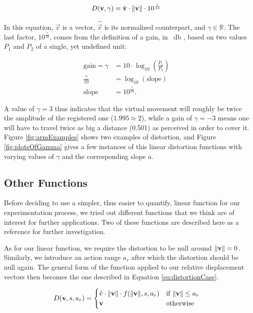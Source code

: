 \begin{equation}
\label{eq:DistortionFunction}
D(\mathbf{v},\gamma ) = \hat{\mathbf{v}} \cdot \lVert\mathbf{v}\rVert \cdot 10^{\frac{\gamma}{10}}
\end{equation}

In this equation, $\vec{v}$ is a vector, $\hat{\vec{v}}$ is its normalized counterpart, and $\gamma \in \mathbb{R}$. The last factor, $10^{\frac{\gamma}{10}}$, comes from the definition of a gain, in \SI{}{\decibel} \cite{book:decibel}, based on two values $P_1$ and $P_2$ of a single, yet undefined unit:

\begin{align*}
    \text{gain} = \gamma &= 10 \cdot \log_{10} (\frac{P_1}{P_2})\\
    \frac{\gamma}{10} &= \log_{10} (\text{slope})\\
    \text{slope} &= 10^{\frac{\gamma}{10}}.
\end{align*}

A value of $\gamma = 3$ thus indicates that the virtual movement will roughly be twice the amplitude of the registered one ($1.995 \approx 2$), while a gain of $\gamma = -3$ means one will have to travel twice as big a distance (\num{0.501}) as perceived in order to cover it. Figure \ref{fig:armExamples} shows two examples of distortion, and Figure \ref{fig:plotsOfGamma} gives a few instances of this linear distortion functions with varying values of $\gamma $ and the corresponding slope $a$.

\subsection{Other Functions}
\label{sec:otherFunctions}
Before deciding to use a simpler, thus easier to quantify, linear function for our experimentation process, we tried out different functions that we think are of interest for further applications. Two of these functions are described here as a reference for further investigation.

As for our linear function, we require the distortion to be null around $\lVert\mathbf{v}\rVert = 0$. Similarly, we introduce an action range $a_r$ after which the distortion should be null again. The general form of the function applied to our relative displacement vectors then becomes the one described in Equation \ref{eq:distortionCase}.

\begin{equation}
    \label{eq:distortionCase}
    D(\mathbf{v}, s, a_r) =
    \begin{cases}
        \hat{v} \cdot \lVert\mathbf{v}\rVert \cdot f(\lVert\mathbf{v}\rVert, s, a_r)    &\text{if } \lVert\mathbf{v}\rVert \leq a_r\\
        \mathbf{v}                                                         &\text{otherwise}
    \end{cases}
\end{equation}

